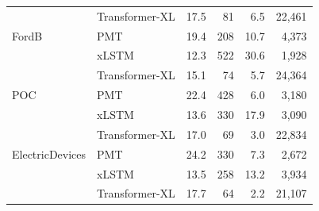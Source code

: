 \begin{table}[tb]
\begin{tabular}{llrrrr}
 & Transformer-XL & 17.5 & 81 & 6.5 & 22{,}461 \\
\addlinespace
FordB & PMT & 19.4 & 208 & 10.7 & 4{,}373 \\
 & xLSTM & 12.3 & 522 & 30.6 & 1{,}928 \\
 & Transformer-XL & 15.1 & 74 & 5.7 & 24{,}364 \\
\addlinespace
POC & PMT & 22.4 & 428 & 6.0 & 3{,}180 \\
 & xLSTM & 13.6 & 330 & 17.9 & 3{,}090 \\
 & Transformer-XL & 17.0 & 69 & 3.0 & 22{,}834 \\
\addlinespace
ElectricDevices & PMT & 24.2 & 330 & 7.3 & 2{,}672 \\
 & xLSTM & 13.5 & 258 & 13.2 & 3{,}934 \\
 & Transformer-XL & 17.7 & 64 & 2.2 & 21{,}107 \\
\bottomrule
\end{tabular}
\end{table}
